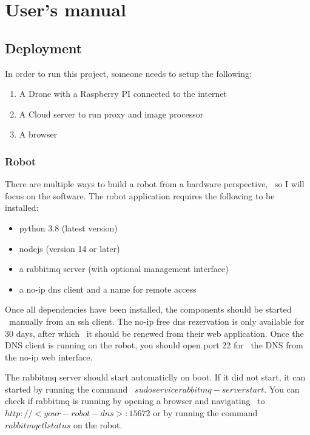 

\chapter{User's manual}
\label{ch:user-manual}

\section{Deployment}
\label{sec:user-manual-deployment}

In order to run this project, someone needs to setup the following:
\begin{enumerate}
    \item A Drone with a Raspberry PI connected to the internet
    \item A Cloud server to run proxy and image processor
    \item A browser
\end{enumerate}

\subsection{Robot}
\label{subsec:user-manual-robot}
There are multiple ways to build a robot from a hardware perspective, \
so I will focus on the software.
The robot application requires the following to be installed:
\begin{itemize}
    \item python 3.8 (latest version)
    \item nodejs (version 14 or later)
    \item a rabbitmq server (with optional management interface)
    \item a no-ip dns client and a name for remote access
\end{itemize}
Once all dependencies have been installed, the components should be started \
manually from an ssh client.
The no-ip free dns rezervation is only available for 30 days, after which \
it should be renewed from their web application.
Once the DNS client is running on the robot, you should open port 22 for \
the DNS from the no-ip web interface.

The rabbitmq server should start automaticlly on boot.
If it did not start, it can started by running the command \
$sudo service rabbitmq-server start$.
You can check if rabbitmq is running by opening a browser and navigating \
to $http://<your-robot-dns>:15672$ or by running the command
$rabbitmqctl status$ on the robot.

